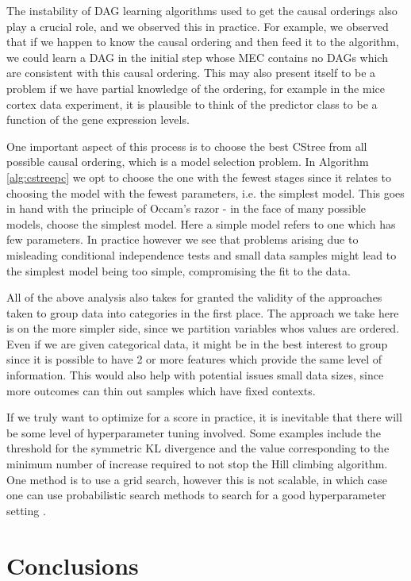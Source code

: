 \documentclass{tufte-book}
\begin{document}
The instability of DAG learning algorithms used to get the causal orderings also play a crucial role, and we observed this in practice. For example, we observed that if we happen to know the causal ordering and then feed it to the algorithm, we could learn a DAG in the initial step whose MEC contains no DAGs which are consistent with this causal ordering.  This may also present itself to be a problem if we have partial knowledge of the ordering, for example in the mice cortex data experiment, it is plausible to think of the predictor class to be a function of the gene expression levels.


One important aspect of this process is to choose the best CStree from all possible causal ordering, which is a model selection problem. In Algorithm \ref{alg:cstreepc} we opt to choose the one with the fewest stages since it relates to choosing the model with the fewest parameters, i.e. the simplest model. This goes in hand with the principle of Occam's razor \cite{pearl-2009-causal} - in the face of many possible models, choose the simplest model. Here a simple model refers to one which has few parameters. In practice however we see that problems arising due to misleading conditional independence tests and small data samples might lead to the simplest model being too simple, compromising the fit to the data.


All of the above analysis also takes for granted the validity of the approaches taken to group data into categories in the first place. The approach we take here is on the more simpler side, since we partition variables whos values are ordered. Even if we are given categorical data, it might be in the best interest to group since it is possible to have 2 or more features which provide the same level of information. This would also help with potential issues small data sizes, since more outcomes can thin out samples which have fixed contexts.


If we truly want to optimize for a score in practice, it is inevitable that there will be some level of hyperparameter tuning involved. Some examples include the threshold for the symmetric KL divergence and the value corresponding to the minimum number of increase required to not stop the Hill climbing algorithm. One method is to use a grid search, however this is not scalable, in which case one can use probabilistic search methods to search for a good hyperparameter setting \cite{baptista-2018-bayes-optim}.


\chapter{Conclusions}
\label{sec:orgc557bdb}
\end{document}
